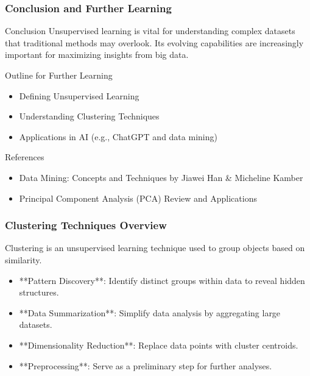 \documentclass[aspectratio=169]{beamer}
\begin{document}
\begin{frame}[fragile]
    \frametitle{Conclusion and Further Learning}
    
    \begin{block}{Conclusion}
        Unsupervised learning is vital for understanding complex datasets that traditional methods may overlook. Its evolving capabilities are increasingly important for maximizing insights from big data.
    \end{block}

    \begin{block}{Outline for Further Learning}
        \begin{itemize}
            \item Defining Unsupervised Learning
            \item Understanding Clustering Techniques
            \item Applications in AI (e.g., ChatGPT and data mining)
        \end{itemize}
    \end{block}

    \begin{block}{References}
        \begin{itemize}
            \item Data Mining: Concepts and Techniques by Jiawei Han \& Micheline Kamber
            \item Principal Component Analysis (PCA) Review and Applications
        \end{itemize}
    \end{block}
\end{frame}

\begin{frame}[fragile]
    \frametitle{Clustering Techniques Overview}
    Clustering is an unsupervised learning technique used to group objects based on similarity.
    \begin{itemize}
        \item **Pattern Discovery**: Identify distinct groups within data to reveal hidden structures.
        \item **Data Summarization**: Simplify data analysis by aggregating large datasets.
        \item **Dimensionality Reduction**: Replace data points with cluster centroids.
        \item **Preprocessing**: Serve as a preliminary step for further analyses.
    \end{itemize}
\end{frame}
\end{document}
